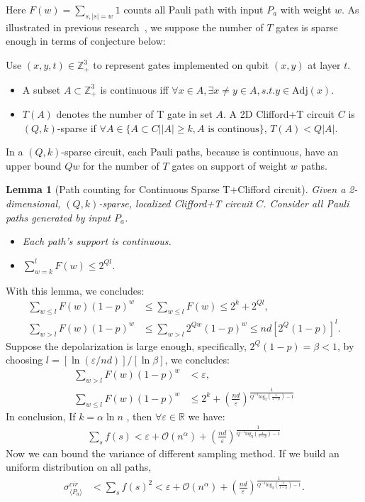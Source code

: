 \documentclass[aps,%
twocolumn,%
floatfix,%
pra,%
amsfonts,%
longbibliography,%
groupedaddress,%
superscriptaddress]{revtex4-2}%
\newtheorem{lemma}{Lemma}
\newcommand{\1}{\mathbbm{1}}
\begin{document}
    Here $F(w) = \sum_{s,|s| = w} 1$ counts all Pauli path with input $P_a$ with weight $w$.
As illustrated in previous research~\cite{gonzalez2024pauli}, we suppose the number of $T$ gates is sparse enough in terms of conjecture below:

Use $(x,y,t) \in \mathbb{Z}_+^3$ to represent gates implemented on qubit $(x,y)$ at layer $t$.  
\begin{itemize}
    \item A subset $A \subset \mathbb{Z}_+^3$ is continuous iff  $\forall x \in A, \exists x \neq y \in A, s.t. y \in \text{Adj}(x) $.
    \item $T(A)$ denotes the number of T gate in set $A$. A 2D Clifford+T circuit $C$ is $(Q,k)$-sparse if  $\forall A \in \{ A\subset C| |A| \geq k, A \text{~is continous}\}$, $T(A) < Q|A|$. 
\end{itemize}

In a $(Q,k)$-sparse circuit, each Pauli paths, because is continuous, have an upper bound $Qw$ for the number of $T$ gates on support of weight $w$ paths.  
\begin{lemma}[Path counting for Continuous Sparse T+Clifford circuit]
   Given a 2-dimensional, $(Q,k)$-sparse, localized Clifford+T circuit $C$.  Consider all Pauli paths generated by input $P_a$.
    \begin{itemize}
        \item   Each path's support is continuous.
        \item   $\sum_{w = k}^l F(w) \leq 2^{Ql}$.
    \end{itemize}
\end{lemma}
With this lemma, we concludes:
\begin{align}
    \sum_{w \leq l} F(w)(1 - p)^w &\leq \sum_{w \leq l} F(w) \leq 2^k + 2^{Ql}, \\
    \sum_{w > l} F(w) (1 - p)^w &\leq \sum_{w > l} 2^{Qw}(1 - p)^w \leq nd [2^{Q}(1 - p)]^l.
\end{align}
Suppose the depolarization is large enough, specifically, $2^Q(1 - p) = \beta < 1$, by choosing $l = [\ln (\varepsilon / nd)]/[\ln \beta]  $, we concludes:
\begin{align}
    \sum_{w > l} F(w) (1 - p)^w &< \varepsilon,\\
    \sum_{w \leq l} F(w)(1 - p)^w  &\leq 2^k + (\frac{nd}{\varepsilon})^{\frac{1}{Q^{-1} \text{log}_2(\frac{1}{1 - p}) - 1 }}
\end{align}
In conclusion, If $k = \alpha \ln n$ , then $\forall \varepsilon \in \mathbb{R}$ we have:
\begin{align}
    \sum_s f(s)  < \varepsilon + \mathcal{O}(n^{\alpha}) + (\frac{nd}{\varepsilon})^{\frac{1}{Q^{-1} \text{log}_2(\frac{1}{1 - p}) - 1 }}
\end{align}
Now we can bound the variance of different sampling method. If we build an uniform distribution on all paths,
\begin{align}
    \sigma_{\langle P_a \rangle}^{cir} &< \sum_s f(s)^2 <   \varepsilon + \mathcal{O}(n^{\alpha}) + (\frac{nd}{\varepsilon})^{\frac{1}{Q^{-1} \text{log}_2(\frac{1}{1 - p}) - 1 }}.
\end{align}
\end{document}
